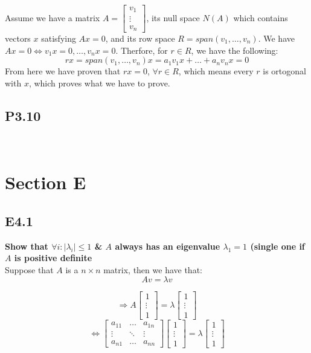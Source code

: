 \documentclass[12pt]{article}
\begin{document}
Assume we have a matrix $A = \begin{bmatrix}
v_1\\
\vdots\\
v_n

\end{bmatrix}$, its null space $N(A)$ which contains vectors $x$ satisfying $Ax=0$, and its row space $R = span(v_1,\ldots,v_n)$. We have $Ax = 0 \Leftrightarrow v_1x=0, \ldots, v_nx=0$. Therfore, for $r \in R$, we have the following: $$rx = span(v_1,\ldots,v_n)x = a_1v_1x + \ldots+ a_nv_nx = 0$$
From here we have proven that $rx=0$, $\forall  r \in R$, which means every $r$ is ortogonal with $x$, which proves what we have to prove.




\subsection*{P3.10}
\textbf{}\\




\section*{Section E}
\subsection*{E4.1}
\textbf{Show that $\forall i: |\lambda_i|\leq 1$ \& $A$ always has an eigenvalue $\lambda_1=1$ (single one if $A$ is positive definite}\\

Suppose that $A$ is a $n\times n$ matrix, then we have that:
$$Av=\lambda v$$

$$\Rightarrow   A\begin{bmatrix}
1\\
\vdots\\
1
\end{bmatrix}
=\lambda \begin{bmatrix}
1\\
\vdots\\
1
\end{bmatrix}$$
$$\Leftrightarrow \begin{bmatrix}
a_{11} &\ldots &  a_{1n} \\
\vdots & \ddots & \vdots \\
a_{n1} &\ldots & a_{nn}
\end{bmatrix}\begin{bmatrix}
1\\
\vdots\\
1
\end{bmatrix}=\lambda \begin{bmatrix}
1\\
\vdots\\
1
\end{bmatrix}$$
\end{document}
